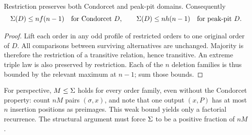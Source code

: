 \begin{lemma}\label{lem:deletion-upper}
Restriction preserves both Condorcet and peak-pit domains. Consequently
\[
 \Sigma(D)\leq nf(n-1)\quad\text{for Condorcet }D,\qquad
 \Sigma(D)\leq nh(n-1)\quad\text{for peak-pit }D.
\]
\end{lemma}
\begin{proof}
Lift each order in any odd profile of restricted orders to one original
order of \(D\). All comparisons between surviving alternatives are
unchanged. Majority is therefore the restriction of a transitive
relation, hence transitive. An extreme triple law is also preserved by
restriction. Each of the \(n\) deletion families is thus bounded by
the relevant maximum at \(n-1\); sum those bounds.
\end{proof}


For perspective, \(M\leq\Sigma\) holds for every order family, even
without the Condorcet property: count \(nM\) pairs \((\sigma,x)\),
and note that one output \((x,P)\) has at most \(n\) insertion positions
as preimages. This weak bound yields only a factorial recurrence.
The structural argument must force \(\Sigma\) to be a positive fraction
of \(nM\).
